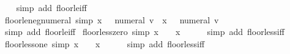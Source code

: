 \begin{isabellebody}
%
\isadelimproof
\ \ %
\endisadelimproof
%
\isatagproof
{}\isamarkupfalse%
\ {\isacharparenleft}{\kern0pt}simp\ add{\isacharcolon}{\kern0pt}\ floor{\isacharunderscore}{\kern0pt}le{\isacharunderscore}{\kern0pt}iff{\isacharparenright}{\kern0pt}%
\endisatagproof
{\isafoldproof}%
%
\isadelimproof
\isanewline
%
\endisadelimproof
\isanewline
{}\isamarkupfalse%
\ floor{\isacharunderscore}{\kern0pt}le{\isacharunderscore}{\kern0pt}neg{\isacharunderscore}{\kern0pt}numeral\ {\isacharbrackleft}{\kern0pt}simp{\isacharbrackright}{\kern0pt}{\isacharcolon}{\kern0pt}\ {\isachardoublequoteopen}{\isasymlfloor}x{\isasymrfloor}\ {\isasymle}\ {\isacharminus}{\kern0pt}\ numeral\ v\ {\isasymlongleftrightarrow}\ x\ {\isacharless}{\kern0pt}\ {\isacharminus}{\kern0pt}\ numeral\ v\ {\isacharplus}{\kern0pt}\ {}{\isachardoublequoteclose}\isanewline
%
\isadelimproof
\ \ %
\endisadelimproof
%
\isatagproof
{}\isamarkupfalse%
\ {\isacharparenleft}{\kern0pt}simp\ add{\isacharcolon}{\kern0pt}\ floor{\isacharunderscore}{\kern0pt}le{\isacharunderscore}{\kern0pt}iff{\isacharparenright}{\kern0pt}%
\endisatagproof
{\isafoldproof}%
%
\isadelimproof
\isanewline
%
\endisadelimproof
\isanewline
{}\isamarkupfalse%
\ floor{\isacharunderscore}{\kern0pt}less{\isacharunderscore}{\kern0pt}zero\ {\isacharbrackleft}{\kern0pt}simp{\isacharbrackright}{\kern0pt}{\isacharcolon}{\kern0pt}\ {\isachardoublequoteopen}{\isasymlfloor}x{\isasymrfloor}\ {\isacharless}{\kern0pt}\ {}\ {\isasymlongleftrightarrow}\ x\ {\isacharless}{\kern0pt}\ {}{\isachardoublequoteclose}\isanewline
%
\isadelimproof
\ \ %
\endisadelimproof
%
\isatagproof
{}\isamarkupfalse%
\ {\isacharparenleft}{\kern0pt}simp\ add{\isacharcolon}{\kern0pt}\ floor{\isacharunderscore}{\kern0pt}less{\isacharunderscore}{\kern0pt}iff{\isacharparenright}{\kern0pt}%
\endisatagproof
{\isafoldproof}%
%
\isadelimproof
\isanewline
%
\endisadelimproof
\isanewline
{}\isamarkupfalse%
\ floor{\isacharunderscore}{\kern0pt}less{\isacharunderscore}{\kern0pt}one\ {\isacharbrackleft}{\kern0pt}simp{\isacharbrackright}{\kern0pt}{\isacharcolon}{\kern0pt}\ {\isachardoublequoteopen}{\isasymlfloor}x{\isasymrfloor}\ {\isacharless}{\kern0pt}\ {}\ {\isasymlongleftrightarrow}\ x\ {\isacharless}{\kern0pt}\ {}{\isachardoublequoteclose}\isanewline
%
\isadelimproof
\ \ %
\endisadelimproof
%
\isatagproof
{}\isamarkupfalse%
\ {\isacharparenleft}{\kern0pt}simp\ add{\isacharcolon}{\kern0pt}\ floor{\isacharunderscore}{\kern0pt}less{\isacharunderscore}{\kern0pt}iff{\isacharparenright}{\kern0pt}%

\end{isabellebody}
